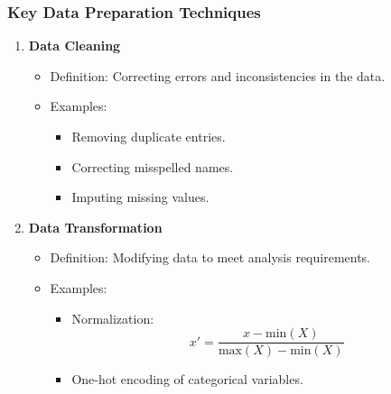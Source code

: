 \documentclass[aspectratio=169]{beamer}
\begin{document}
\begin{frame}[fragile]
    \frametitle{Key Data Preparation Techniques}
    \begin{enumerate}
        \item \textbf{Data Cleaning}
        \begin{itemize}
            \item Definition: Correcting errors and inconsistencies in the data.
            \item Examples:
                \begin{itemize}
                    \item Removing duplicate entries.
                    \item Correcting misspelled names.
                    \item Imputing missing values.
                \end{itemize}
        \end{itemize}

        \item \textbf{Data Transformation}
        \begin{itemize}
            \item Definition: Modifying data to meet analysis requirements.
            \item Examples:
                \begin{itemize}
                    \item Normalization:
                    \begin{equation}
                    x' = \frac{x - \text{min}(X)}{\text{max}(X) - \text{min}(X)}
                    \end{equation}
                    \item One-hot encoding of categorical variables.
                \end{itemize}
        \end{itemize}
    \end{enumerate}
\end{frame}
\end{document}
